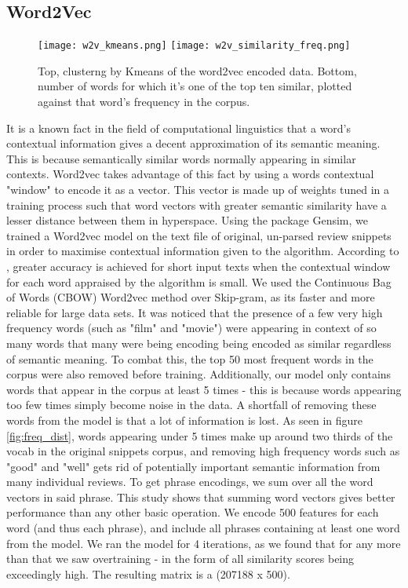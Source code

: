 \documentclass{article}
\begin{document}
\subsection*{Word2Vec}
\begin{wrapfigure}{r}{0.4\textwidth}
    \texttt{[image: w2v\_kmeans.png]}
    \texttt{[image: w2v\_similarity\_freq.png]}
    \caption{Top, clusterng by Kmeans of the word2vec encoded data. Bottom, number of words for which it's one of the top ten similar, plotted against that word's frequency in the corpus.}
    \label{fig:w2v_freq}
\end{wrapfigure}It is a known fact in the field of computational linguistics that a word's contextual information gives a decent approximation of its semantic meaning. This is because semantically similar words normally appearing in similar contexts\cite{baroni-etal-2014-dont}. Word2vec takes advantage of this fact by using a words contextual "window" to encode it as a vector. This vector is made up of weights tuned in a training process such that word vectors with greater semantic similarity have a lesser distance between them in hyperspace. Using the package Gensim\cite{word2vec model}, we trained a Word2vec model on the text file of original, un-parsed review snippets in order to maximise contextual information given to the algorithm. According to \cite{DBLP:journals/corr/LisonK17}, greater accuracy is achieved for short input texts when the contextual window for each word appraised by the algorithm is small. We used the Continuous Bag of Words (CBOW) Word2vec method over Skip-gram, as its faster and more reliable for large data sets\cite{DBLP:journals/corr/MikolovLS13}. It was noticed that the presence of a few very high frequency words (such as "film" and "movie") were appearing in context of so many words that many were being encoding being encoded as similar regardless of semantic meaning. To combat this, the top 50 most frequent words in the corpus were also removed before training. Additionally, our model only contains words that appear in the corpus at least 5 times - this is because words appearing too few times simply become noise in the data. A shortfall of removing these words from the model is that a lot of information is lost. As seen in figure \ref{fig:freq_dist}, words appearing under 5 times make up around two thirds of the vocab in the original snippets corpus, and removing high frequency words such as "good" and "well" gets rid of potentially important semantic information from many individual reviews. To get phrase encodings, we sum over all the word vectors in said phrase. This study \cite{inbook} shows that summing word vectors gives better performance than any other basic operation. We encode 500 features for each word (and thus each phrase), and include all phrases containing at least one word from the model. We ran the model for 4 iterations, as we found that for any more than that we saw overtraining - in the form of all similarity scores being exceedingly high. The resulting matrix is a (207188 x 500).
\end{document}
